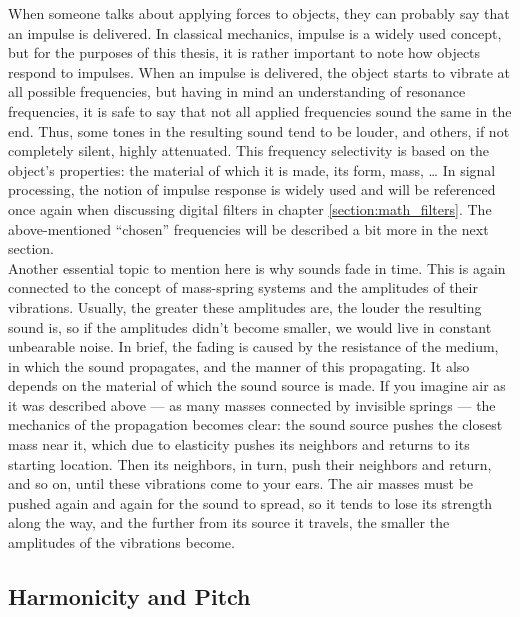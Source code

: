 When someone talks about applying forces to objects, they can probably say that an impulse is delivered. In classical mechanics, impulse is a widely used concept, but for the purposes of this thesis, it is rather important to note how objects respond to impulses. When an impulse is delivered, the object starts to vibrate at all possible frequencies, but having in mind an understanding of resonance frequencies, it is safe to say that not all applied frequencies sound the same in the end. Thus, some tones in the resulting sound tend to be louder, and others, if not completely silent, highly attenuated. This frequency selectivity is based on the object's properties: the material of which it is made, its form, mass, \dots{} In signal processing, the notion of impulse response is widely used and will be referenced once again when discussing digital filters in chapter \ref{section:math_filters}. The above-mentioned “chosen” frequencies will be described a bit more in the next section.\\

Another essential topic to mention here is why sounds fade in time. This is again connected to the concept of mass-spring systems and the amplitudes of their vibrations. Usually, the greater these amplitudes are, the louder the resulting sound is, so if the amplitudes didn’t become smaller, we would live in constant unbearable noise. In brief, the fading is caused by the resistance of the medium, in which the sound propagates, and the manner of this propagating. It also depends on the material of which the sound source is made. If you imagine air as it was described above --- as many masses connected by invisible springs --- the mechanics of the propagation becomes clear: the sound source pushes the closest mass near it, which due to elasticity pushes its neighbors and returns to its starting location. Then its neighbors, in turn, push their neighbors and return, and so on, until these vibrations come to your ears. The air masses must be pushed again and again for the sound to spread, so it tends to lose its strength along the way, and the further from its source it travels, the smaller the amplitudes of the vibrations become.

\subsection{Harmonicity and Pitch}\label{section:physics_harmonics_pitch}

